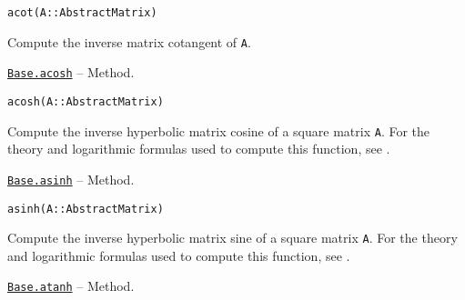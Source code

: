 \begin{adjustwidth}{2em}{0pt}


\begin{verbatim}
acot(A::AbstractMatrix)
\end{verbatim}

Compute the inverse matrix cotangent of \texttt{A}.



\end{adjustwidth}
\hypertarget{17732786606876050735}{}
\hyperlink{17732786606876050735}{\texttt{Base.acosh}}  -- {Method.}

\begin{adjustwidth}{2em}{0pt}


\begin{verbatim}
acosh(A::AbstractMatrix)
\end{verbatim}

Compute the inverse hyperbolic matrix cosine of a square matrix \texttt{A}.  For the theory and logarithmic formulas used to compute this function, see \footnotemark[15].



\end{adjustwidth}
\hypertarget{2994935886464306087}{}
\hyperlink{2994935886464306087}{\texttt{Base.asinh}}  -- {Method.}

\begin{adjustwidth}{2em}{0pt}


\begin{verbatim}
asinh(A::AbstractMatrix)
\end{verbatim}

Compute the inverse hyperbolic matrix sine of a square matrix \texttt{A}.  For the theory and logarithmic formulas used to compute this function, see \footnotemark[16].



\end{adjustwidth}
\hypertarget{18027939716424189569}{}
\hyperlink{18027939716424189569}{\texttt{Base.atanh}}  -- {Method.}

